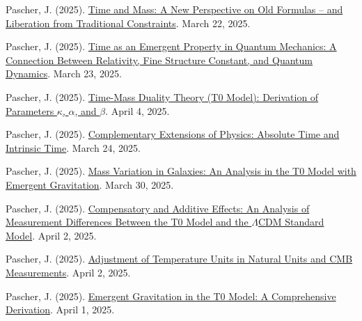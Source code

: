 \documentclass[12pt,a4paper]{article}
\begin{document}
	\begin{thebibliography}{99}
		 Pascher, J. (2025). \href{https://github.com/jpascher/T0-Time-Mass-Duality/tree/main/2/pdf/English/ZeitMasseNeuerBlickEn.pdf}{Time and Mass: A New Perspective on Old Formulas – and Liberation from Traditional Constraints}. March 22, 2025.
		
		 Pascher, J. (2025). \href{https://github.com/jpascher/T0-Time-Mass-Duality/tree/main/2/pdf/English/ZeitEmergentQMEn.pdf}{Time as an Emergent Property in Quantum Mechanics: A Connection Between Relativity, Fine Structure Constant, and Quantum Dynamics}. March 23, 2025.
		
		 Pascher, J. (2025). \href{https://github.com/jpascher/T0-Time-Mass-Duality/tree/main/2/pdf/English/ZeitMasseT0ParamsEn.pdf}{Time-Mass Duality Theory (T0 Model): Derivation of Parameters $\kappa$, $\alpha$, and $\beta$}. April 4, 2025.
		
		 Pascher, J. (2025). \href{https://github.com/jpascher/T0-Time-Mass-Duality/tree/main/2/pdf/English/KomplementPhysikZeitEn.pdf}{Complementary Extensions of Physics: Absolute Time and Intrinsic Time}. March 24, 2025.
		
		 Pascher, J. (2025). \href{https://github.com/jpascher/T0-Time-Mass-Duality/tree/main/2/pdf/English/MassVarGalaxienEn.pdf}{Mass Variation in Galaxies: An Analysis in the T0 Model with Emergent Gravitation}. March 30, 2025.
		
		 Pascher, J. (2025). \href{https://github.com/jpascher/T0-Time-Mass-Duality/tree/main/2/pdf/English/MessdifferenzenT0StandardEn.pdf}{Compensatory and Additive Effects: An Analysis of Measurement Differences Between the T0 Model and the $\Lambda$CDM Standard Model}. April 2, 2025.
		
		 Pascher, J. (2025). \href{https://github.com/jpascher/T0-Time-Mass-Duality/tree/main/2/pdf/English/TempEinheitenCMBEn.pdf}{Adjustment of Temperature Units in Natural Units and CMB Measurements}. April 2, 2025.
		
		 Pascher, J. (2025). \href{https://github.com/jpascher/T0-Time-Mass-Duality/tree/main/2/pdf/English/EmergentGravT0En.pdf}{Emergent Gravitation in the T0 Model: A Comprehensive Derivation}. April 1, 2025.
		

\end{thebibliography}
\end{document}
